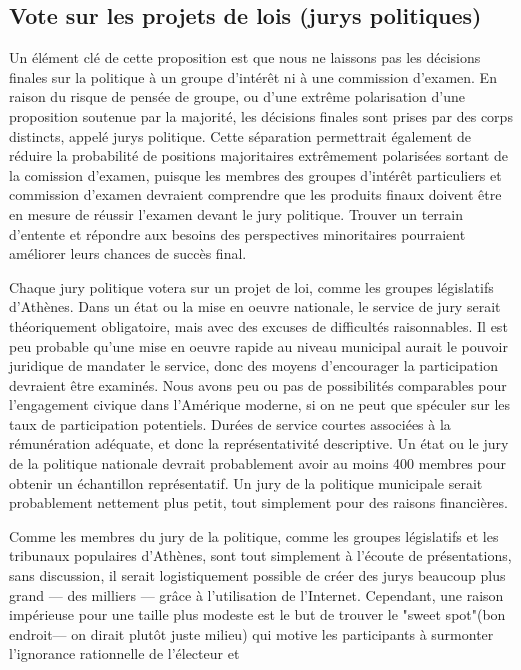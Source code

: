 \subsection{Vote sur les projets de lois (jurys politiques)}
Un élément clé de cette proposition est que nous ne laissons pas les
décisions finales sur la politique à un groupe d'intérêt ni à une
commission d'examen. En raison du risque de pensée de groupe, ou d'une
extrême polarisation d'une proposition soutenue par la majorité, les
décisions finales sont prises par des corps distincts, appelé jurys
politique. Cette séparation permettrait également de réduire la
probabilité de positions majoritaires extrêmement polarisées sortant
de la comission d'examen, puisque les membres des groupes d'intérêt
particuliers et commission d'examen devraient comprendre que les produits
finaux doivent être en mesure de réussir l'examen devant le jury
politique. Trouver un terrain d'entente et répondre aux besoins des
perspectives minoritaires pourraient améliorer leurs chances de succès
final.\par
Chaque jury politique votera sur un projet de loi, comme les groupes
législatifs d'Athènes. Dans un état ou la mise en oeuvre nationale, le
service de jury serait théoriquement obligatoire, mais avec des
excuses de difficultés raisonnables. Il est peu probable qu'une mise
en oeuvre rapide au niveau municipal aurait le pouvoir juridique de
mandater le service, donc des moyens d'encourager la participation
devraient être examinés. Nous avons peu ou pas de possibilités
comparables pour l'engagement civique dans l'Amérique moderne, si on
ne peut que spéculer sur les taux de participation potentiels. Durées
de service courtes associées à la rémunération adéquate, et donc la
représentativité descriptive. Un état ou le jury  de la politique
nationale devrait probablement avoir au moins 400 membres pour
obtenir un échantillon représentatif. Un jury de la politique
municipale serait probablement nettement plus petit, tout simplement
pour des raisons financières.\par
Comme les membres du jury de la politique, comme les groupes
législatifs et les tribunaux populaires d'Athènes, sont tout
simplement à l'écoute de présentations, sans discussion, il serait
logistiquement possible de créer des jurys beaucoup plus grand --- des
milliers --- grâce à l'utilisation de l'Internet. Cependant, une raison
impérieuse pour une taille plus modeste est le but de trouver le
"sweet spot"(bon endroit--- on dirait plutôt juste milieu)  qui motive
les participants à surmonter l'ignorance rationnelle de l'électeur et
